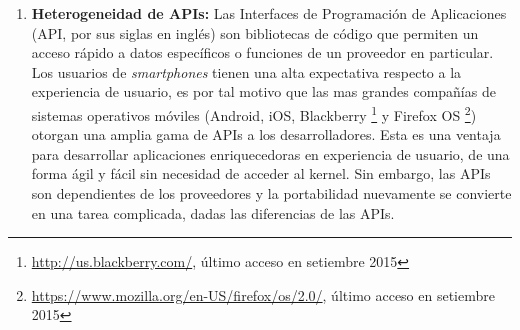 \begin{enumerate}
 Las variaciones en el área de visualización entre los celulares impiden que los desarrolladores diseñar una interfaz de usuario que se adapte a 
 todos los tamaños de pantalla, disminuyendo la experiencia de usuario.	En el entorno Android existe el soporte para la construcción de 
 aplicaciones que se adecúan al contenido de la pantalla en su versión 3.2 en adelante \footnote{
 \url{http://developer.android.com/about/versions/android-3.2.html}, último acceso en setiembre 2015}.
 
 La heterogeneidad en nube está dada por los servicios que cada proveedor ofrece en particular. P. ej. \textit{Google App Engine} ofrece el servicio 
 de Big Query \footnote{\url{https://cloud.google.com/bigquery/}, último acceso en setiembre 2015} que permite a los administradores
 realizar consultas sobre \textit{Big Data} 
 en tiempo real. Microsoft Azure a su vez, es el único que ofrece un servicio de almacenamiento de backups encriptado 
 \footnote{\url{http://azure.microsoft.com/en-us/services/backup/}, último acceso en setiembre 2015} 
  
  \item \textbf{Heterogeneidad de APIs:} Las Interfaces de Programación de Aplicaciones (API, por sus siglas en inglés) son bibliotecas de código
  que permiten un acceso rápido a datos específicos o funciones de un proveedor en particular. Los usuarios de \textit{smartphones} tienen una 
  alta expectativa respecto a la experiencia de usuario, es por tal motivo que las mas grandes compañías de sistemas operativos móviles (Android, iOS, 
  Blackberry \footnote{\url{http://us.blackberry.com/}, último acceso en setiembre 2015} y Firefox OS 
  \footnote{\url{https://www.mozilla.org/en-US/firefox/os/2.0/}, último acceso en setiembre 2015}) otorgan una amplia
  gama de APIs a los desarrolladores. Esta es una ventaja para desarrollar aplicaciones enriquecedoras en experiencia de usuario, de una forma 
  ágil y fácil sin necesidad de acceder al kernel. Sin embargo, las APIs son dependientes de los proveedores y la portabilidad nuevamente se
  convierte en una tarea complicada, dadas las diferencias de las APIs.
  

\end{enumerate}
